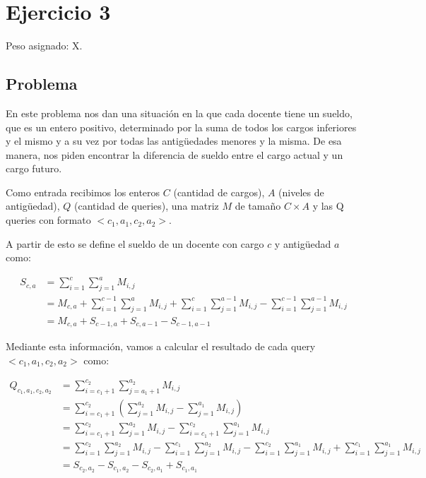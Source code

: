 \section{Ejercicio 3}

Peso asignado: X.

\subsection{Problema}

En este problema nos dan una situación en la que cada docente tiene un sueldo, que es un entero positivo, determinado por la suma de
todos los cargos inferiores y el mismo y a su vez por todas las antigüedades menores y la misma. De esa manera, nos piden encontrar
la diferencia de sueldo entre el cargo actual y un cargo futuro.

Como entrada recibimos los enteros $C$ (cantidad de cargos), $A$ (niveles de antigüedad), $Q$ (cantidad de queries), una matriz $M$
de tamaño $C \times A$ y las Q queries con formato $<c_1, a_1, c_2, a_2>$.

A partir de esto se define el sueldo de un docente con cargo $c$ y antigüedad $a$ como:

\begin{equation*}
\begin{split}
    S_{c,a} & = \sum_{i=1}^{c}{\sum_{j=1}^{a}{M_{i,j}}} \\
    		& = M_{c,a} + \sum_{i=1}^{c-1}{\sum_{j=1}^{a}{M_{i,j}}} + 
    		\sum_{i=1}^{c}{\sum_{j=1}^{a-1}{M_{i,j}}} - 
    		\sum_{i=1}^{c-1}{\sum_{j=1}^{a-1}{M_{i,j}}} \\
    		& = M_{c,a} + S_{c-1,a} + S_{c,a-1} - S_{c-1,a-1}
\end{split}
\end{equation*}

Mediante esta información, vamos a calcular el resultado de cada query $<c_1, a_1, c_2, a_2>$ como:

\begin{equation*}
\begin{split}
    Q_{c_1,a_1,c_2,a_2} & = \sum_{i=c_1+1}^{c_2}{\sum_{j=a_1+1}^{a_2}{M_{i,j}}} \\
    					& = \sum_{i=c_1+1}^{c_2}{(\sum_{j=1}^{a_2}{M_{i,j}} - \sum_{j=1}^{a_1}{M_{i,j}})} \\
    					& = \sum_{i=c_1+1}^{c_2}{\sum_{j=1}^{a_2}{M_{i,j}}} - \sum_{i=c_1+1}^{c_2}{\sum_{j=1}^{a_1}{M_{i,j}}} \\
    					& = \sum_{i=1}^{c_2}{\sum_{j=1}^{a_2}{M_{i,j}}} - \sum_{i=1}^{c_1}{\sum_{j=1}^{a_2}{M_{i,j}}} -
    					\sum_{i=1}^{c_2}{\sum_{j=1}^{a_1}{M_{i,j}}} + \sum_{i=1}^{c_1}{\sum_{j=1}^{a_1}{M_{i,j}}} \\
    					& = S_{c_2,a_2} - S_{c_1,a_2} - S_{c_2,a_1} + S_{c_1,a_1}
\end{split}
\end{equation*}

